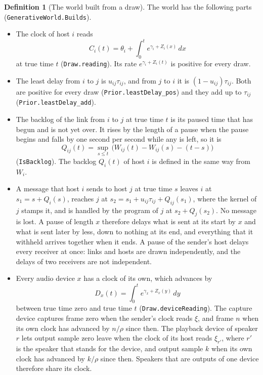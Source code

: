 \documentclass[11pt,a4paper]{article}
\newcommand{\lean}[1]{\texttt{#1}}
\theoremstyle{definition}
\newtheorem{definition}{Definition}[section]
\begin{document}
\begin{definition}[The world built from a draw]
The world has the following parts (\lean{GenerativeWorld.\allowbreak Builds}).
\begin{itemize}
\item The clock of host $i$ reads
  \[
    C_i(t) = \theta_i + \int_0^t e^{\gamma_i + Z_i(x)}\,dx
  \]
  at true time $t$ (\lean{Draw.reading}). Its rate
  $e^{\gamma_i + Z_i(t)}$ is positive for every draw.
\item The least delay from $i$ to $j$ is $u_{ij}\tau_{ij}$, and from $j$ to
  $i$ it is $(1 - u_{ij})\tau_{ij}$. Both are positive for every draw
  (\lean{Prior.leastDelay\_pos}) and they add up to $\tau_{ij}$
  (\lean{Prior.leastDelay\_add}).
\item The backlog of the link from $i$ to $j$ at true time $t$ is its
  paused time that has begun and is not yet over. It rises by the length of
  a pause when the pause begins and falls by one second per second while
  any is left, so it is
  \[
    Q_{ij}(t) = \sup_{s \le t}\,\bigl(W_{ij}(t) - W_{ij}(s) - (t - s)\bigr)
  \]
  (\lean{IsBacklog}). The backlog $Q_i(t)$ of host $i$ is defined in the
  same way from $W_i$.
\item A message that host $i$ sends to host $j$ at true time $s$ leaves
  $i$ at $s_1 = s + Q_i(s)$, reaches $j$ at
  $s_2 = s_1 + u_{ij}\tau_{ij} + Q_{ij}(s_1)$, where the kernel of $j$
  stamps it, and is handled by the program of $j$ at
  $s_2 + Q_j(s_2)$. No message is lost. A pause of length $x$ therefore
  delays what is sent at its start by $x$ and what is sent later by less,
  down to nothing at its end, and everything that it withheld arrives
  together when it ends. A pause of the sender's host delays every receiver
  at once: links and hosts are drawn independently, and the delays of two
  receivers are not independent.
\item Every audio device $x$ has a clock of its own, which advances by
  \[
    D_x(t) = \int_0^t e^{\gamma_x + Z_x(y)}\,dy
  \]
  between true time zero and true time $t$ (\lean{Draw.deviceReading}).
  The capture device captures frame zero when the sender's clock reads
  $\xi$, and frame $n$ when its own clock has advanced by $n/\rho$ since
  then. The playback device of speaker $r$ lets output sample zero leave
  when the clock of its host reads $\xi_{r'}$, where $r'$ is the speaker
  that stands for the device, and output sample $k$ when its own clock has
  advanced by $k/\rho$ since then. Speakers that are outputs of one device
  therefore share its clock.

\end{itemize}
\end{definition}
\end{document}
